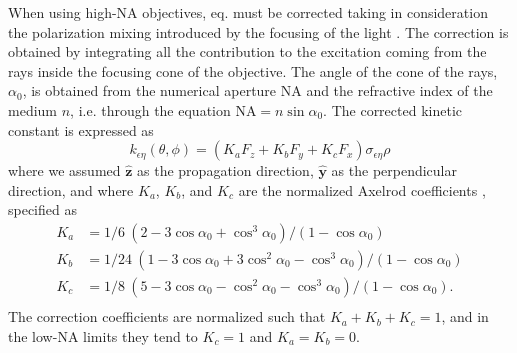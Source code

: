 \documentclass{article}
\begin{document}
When using high-NA objectives, eq.  must be corrected taking in consideration the polarization mixing introduced by the focusing of the light \cite{Fisz2005}. The correction is obtained by integrating all the contribution to the excitation coming from the rays inside the focusing cone of the objective. The angle of the cone of the rays, $\alpha_0$, is obtained from the numerical aperture NA and the refractive index of the medium $n$, i.e. through the equation NA$= n\sin\alpha_0$. The corrected kinetic constant is expressed as
\begin{equation}\label{eq:high_na_k_pre}
    k_{\epsilon\eta}(\theta,\phi) =
    \left(K_a F_z + K_b F_y + K_c F_x\right)
    \sigma_{\epsilon\eta} \rho
\end{equation}
where we assumed $\hat{\mathbf{z}}$ as the propagation direction, $\hat{\mathbf{y}}$ as the perpendicular direction, and where $K_a$, $K_b$, and $K_c$ are the normalized Axelrod coefficients \cite{Fisz2005}, specified as
\begin{equation}\label{eq:high_na_k}
\begin{aligned}
    K_a &= 1/6 \ (2 - 3\cos\alpha_0 +\cos^3\alpha_0)/(1 - \cos\alpha_0)\\
    K_b &= 1/24 \ (1 - 3\cos\alpha_0 + 3\cos^2\alpha_0 -\cos^3\alpha_0)/(1 - \cos\alpha_0) \\
    K_c &= 1/8 \ (5 - 3\cos\alpha_0 - \cos^2\alpha_0 -\cos^3\alpha_0)/(1 - \cos\alpha_0). \\
\end{aligned}
\end{equation}
The correction coefficients are normalized such that $K_a + K_b + K_c = 1$, and in the low-NA limits they tend to $K_c=1$ and $K_a=K_b=0$.

\end{document}
